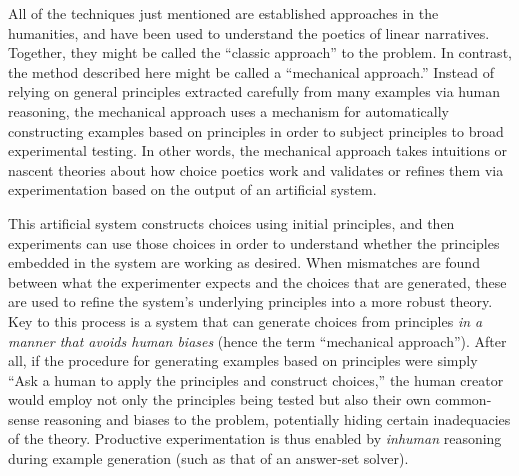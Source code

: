 All of the techniques just mentioned are established approaches in the humanities, and have been used to understand the poetics of linear narratives.
%
Together, they might be called the ``classic approach'' to the problem.
%
In contrast, the method described here might be called a ``mechanical approach.''
%
Instead of relying on general principles extracted carefully from many examples via human reasoning, the mechanical approach uses a mechanism for automatically constructing examples based on principles in order to subject principles to broad experimental testing.
%
In other words, the mechanical approach takes intuitions or nascent theories about how choice poetics work and validates or refines them via experimentation based on the output of an artificial system.


This artificial system constructs choices using initial principles, and then experiments can use those choices in order to understand whether the principles embedded in the system are working as desired.
%
When mismatches are found between what the experimenter expects and the choices that are generated, these are used to refine the system's underlying principles into a more robust theory.
%
Key to this process is a system that can generate choices from principles \emph{in a manner that avoids human biases} (hence the term ``mechanical approach'').
%
After all, if the procedure for generating examples based on principles were simply ``Ask a human to apply the principles and construct choices,'' the human creator would employ not only the principles being tested but also their own common-sense reasoning and biases to the problem, potentially hiding certain inadequacies of the theory.
%
Productive experimentation is thus enabled by \emph{inhuman} reasoning during example generation (such as that of an answer-set solver).


